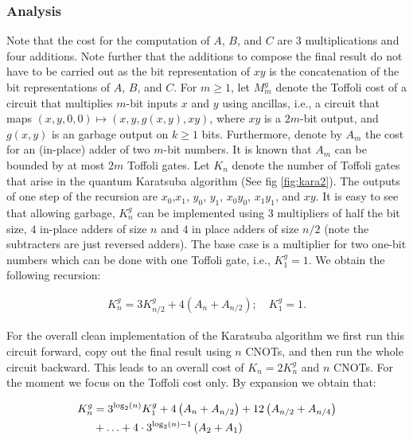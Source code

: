     \subsubsection{Analysis}

      Note that the cost for the computation of $A$, $B$, and $C$ are $3$
      multiplications and four additions.  Note further that the additions to
      compose the final result do not have to be carried out as the bit
      representation of $xy$ is the concatenation of the bit representations of
      $A$, $B$, and $C$.  For $m\geq 1$, let $M^{g}_m$ denote the Toffoli cost
      of a circuit that multiplies $m$-bit inputs $x$ and $y$ using ancillas,
      i.e., a circuit that maps $(x, y, 0, 0) \mapsto (x, y, g(x,y), xy)$,
      where $xy$ is a $2m$-bit output, and $g(x,y)$ is an garbage output on
      $k\geq 1$ bits.  Furthermore, denote by $A_m$ the cost for an (in-place)
      adder of two $m$-bit numbers.  It is known that $A_m$ can be bounded by
      at most $2m$ Toffoli gates. Let $K_n$ denote the number of Toffoli gates
      that arise in the quantum Karatsuba algorithm (See fig \cref{fig:kara2}).
      The outputs of one step of the recursion are $x_0$,$x_1$, $y_0$, $y_1$,
      $x_0y_0$, $x_1 y_1$, and $xy$.  It is easy to see that allowing garbage,
      $K_n^g$ can be implemented using $3$ multipliers of half the bit size,
      $4$ in-place adders of size $n$ and $4$ in place adders of size $n/2$
      (note the subtracters are just reversed adders).  The base case is a
      multiplier for two one-bit numbers which can be done with one Toffoli
      gate, i.e., $K_1^{g}=1$.  We obtain the following recursion:

      \begin{align}
        K_n^{g} = 3 K_{n/2}^{g} + 4 \left(A_{n} + A_{n/2}\right); \quad K_1^{g}=1.
      \end{align}

      For the overall clean implementation of the Karatsuba algorithm we first
      run this circuit forward, copy out the final result using $n$ CNOTs, and
      then run the whole circuit backward.  This leads to an overall cost of
      $K_n = 2 K_n^{g}$ and $n$ CNOTs.  For the moment we focus on the Toffoli
      cost only.  By expansion we obtain that:

      \begin{align}
        K_n^{g} &= 3^{\log_2(n)} K_1^{g} + 4\left( A_{n}+ A_{n/2} \right) + 12\left( A_{n/2}+ A_{n/4} \right)\notag\\
                & + \ldots + 4 \cdot 3^{\log_2(n)-1} \left(A_2 + A_1\right)
      \end{align}

